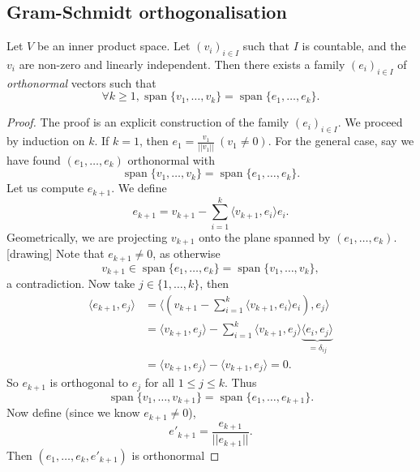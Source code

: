 \documentclass[egregdoesnotlikesansseriftitles,a4paper]{scrartcl}
\begin{document}
\subsection{Gram-Schmidt orthogonalisation}
\begin{theorem}
      Let $V$ be an inner product space. Let $\left(v_i\right)_{i \in I}$ such that $I$ is countable, and the $v_i$ are non-zero and linearly independent. Then there exists a family $\left(e_i\right)_{i \in I}$ of \emph{orthonormal} vectors such that 
      \[\forall k \geq 1, \operatorname{span} \{v_1,\ldots ,v_k\}=\operatorname{span} \{e_1,\ldots ,e_k\}.\]
\end{theorem}

\begin{proof}
      The proof is an explicit construction of the family $\left(e_i\right)_{i \in I}$. We proceed by induction on $k$.\newline 
      If $k=1$, then $e_1=\frac{v_1}{||v_1||} \ \left(v_1 \neq 0\right)$. For the general case, say we have found $\left(e_1, \ldots ,e_k\right)$ orthonormal with 
      \[\operatorname{span} \{v_1,\ldots ,v_k\}=\operatorname{span} \{e_1,\ldots ,e_k\}.\]
      Let us compute $e_{k+1}$. We define 
      \[e_{k+1}=v_{k+1}-\sum_{i=1}^{k}\langle v_{k+1},e_i \rangle e_i .\]
      Geometrically, we are projecting $v_{k+1}$ onto the plane spanned by $\left(e_1, \ldots , e_k\right)$.[drawing] Note that $e_{k+1} \neq 0$, as otherwise 
      \[v_{k+1} \in \operatorname{span} \{e_1,\ldots ,e_k\}=\operatorname{span} \{v_1,\ldots ,v_k\},\]
      a contradiction. Now take $j \in \{1,\ldots ,k\}$, then 
      \begin{equation*}
          \begin{split}
               \langle e_{k+1},e_j \rangle&=\langle \left(v_{k+1}-\sum_{i=1}^{k}\langle v_{k+1},e_i \rangle e_i\right) ,e_j \rangle \\
               &=\langle v_{k+1},e_j \rangle - \sum_{i=1}^{k}\langle v_{k+1},e_j \rangle \underbrace{\langle e_i,e_j \rangle}_{=\delta_{ij}}\\
               &=\langle v_{k+1},e_j \rangle-\langle v_{k+1},e_j \rangle=0.
          \end{split}
      \end{equation*}
      So $e_{k+1}$ is orthogonal to $e_j$ for all $1 \leq j \leq k$. Thus 
      \[\operatorname{span} \{v_1,\ldots ,v_{k+1}\}=\operatorname{span} \{e_1,\ldots ,e_{k+1}\}.\]
      Now define (since we know $e_{k+1} \neq 0$), 
      \[e'_{k+1}=\frac{e_{k+1}}{||e_{k+1}||}.\]
      Then $\left(e_1, \ldots ,e_k, e'_{k+1}\right)$ is orthonormal
\end{proof}
\end{document}
